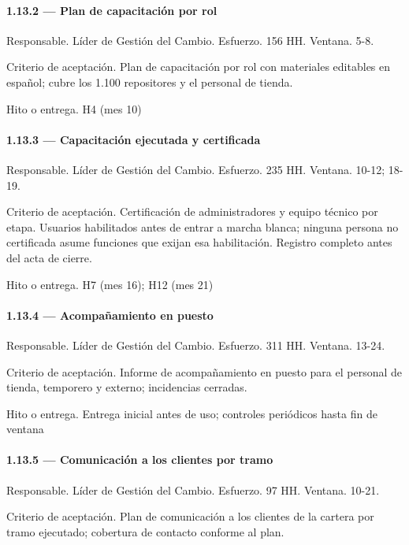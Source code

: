 \documentclass[11pt]{article}
\begin{document}
\paragraph{1.13.2 — Plan de capacitación por rol}

Responsable. Líder de Gestión del Cambio. Esfuerzo. 156 HH. Ventana. 5-8.

Criterio de aceptación. Plan de capacitación por rol con materiales editables en español; cubre los 1.100 repositores y el personal de tienda.

Hito o entrega. H4 (mes 10)

\paragraph{1.13.3 — Capacitación ejecutada y certificada}

Responsable. Líder de Gestión del Cambio. Esfuerzo. 235 HH. Ventana. 10-12; 18-19.

Criterio de aceptación. Certificación de administradores y equipo técnico por etapa. Usuarios habilitados antes de entrar a marcha blanca; ninguna persona no certificada asume funciones que exijan esa habilitación. Registro completo antes del acta de cierre.

Hito o entrega. H7 (mes 16); H12 (mes 21)

\paragraph{1.13.4 — Acompañamiento en puesto}

Responsable. Líder de Gestión del Cambio. Esfuerzo. 311 HH. Ventana. 13-24.

Criterio de aceptación. Informe de acompañamiento en puesto para el personal de tienda, temporero y externo; incidencias cerradas.

Hito o entrega. Entrega inicial antes de uso; controles periódicos hasta fin de ventana

\paragraph{1.13.5 — Comunicación a los clientes por tramo}

Responsable. Líder de Gestión del Cambio. Esfuerzo. 97 HH. Ventana. 10-21.

Criterio de aceptación. Plan de comunicación a los clientes de la cartera por tramo ejecutado; cobertura de contacto conforme al plan.
\end{document}
